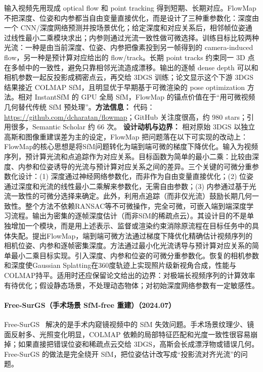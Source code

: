 输入视频先用现成 optical flow 和 point tracking 得到短期、长期对应。FlowMap 不把深度、位姿和内参都当自由变量直接优化，而是设计了三种重参数化：深度由一个 CNN/深度网络预测并按场景优化；给定深度和对应关系后，相邻帧位姿通过线性最小二乘模块求出；内参则通过光流一致性做可微选择。训练目标比较两种光流：一种是由当前深度、位姿、内参把像素投到另一帧得到的 camera-induced flow，另一种是预计算对应给出的 flow/track。长期 point tracks 约束同一 3D 点在多帧中的一致性，避免只靠相邻光流造成漂移。输出的逐帧 dense depth 可以和相机参数一起反投影成稠密点云，再交给 3DGS 训练；论文显示这个下游 3DGS 结果接近 COLMAP SfM，且明显优于早期基于可微渲染的 pose optimization 方法。相对 InstantSfM 的 GPU 全局 SfM，FlowMap 的锚点价值在于“用可微视频几何替代传统 SfM 预处理”。\textbf{方法信息：} 代码：\url{https://github.com/dcharatan/flowmap}；GitHub 关注度很高，约 980 stars；引用很多，Semantic Scholar 约 66 次。
\textbf{设计动机与边界：} 相对原始 3DGS 以独立高斯和图像重建误差为主的设定，FlowMap 把问题落在以下可实现的改动上：FlowMap的核心思想是将SfM问题转化为端到端可微的梯度下降优化。输入为视频序列，预计算光流和点追踪作为对应关系。目标函数为简单的最小二乘：比较由深度、内参和位姿诱导的光流与预计算对应关系之间的差异。三个关键的可微分重参数化设计：(1) 深度通过神经网络参数化，而非作为自由变量直接优化；(2) 位姿通过深度和光流的线性最小二乘解来参数化，无需自由参数；(3) 内参通过基于光流一致性的可微分选择来确定。此外，利用点追踪（而非仅光流）鼓励长期几何一致性。整个方法不依赖RANSAC等不可微操作，完全可微，可嵌入端到端深度学习流程。输出为密集的逐帧深度估计（而非SfM的稀疏点云）。其设计目的不是单独增加一个模块，而是用上述表示、监督或渲染约束消除原流程在目标任务中的具体失配。提出FlowMap，端到端可微方法通过梯度下降优化精确估计视频序列的相机位姿、内参和逐帧密集深度。方法通过最小化光流诱导与预计算对应关系的简单最小二乘目标实现。引入深度、内参和位姿的可微分重参数化。恢复的相机参数和深度使Gaussian Splatting在360度轨迹上实现照片级新视角合成，性能与COLMAP持平。适用时还应保留论文给出的边界：对极端长视频序列的计算效率有待优化；假设静态场景，不处理动态物体；对初始深度网络参数有一定敏感性。
\paragraph{Free-SurGS（手术场景 SfM-free 重建）（2024.07）}
Free-SurGS~\cite{2407_02918} 解决的是手术内窥镜视频中的 SfM 失效问题。手术场景纹理少、镜面反射多、光照变化明显，COLMAP 依赖的局部特征匹配和光度一致性很容易崩掉；如果直接把错误位姿和稀疏点云交给 3DGS，高斯会长成漂浮物或错误几何。Free-SurGS 的做法是完全绕开 SfM，把位姿估计改写成“投影流对齐光流”的问题。

